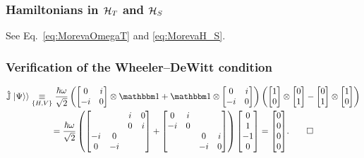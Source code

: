 \subsubsection*{Hamiltonians in $\mathcal{H}_T$ and $\mathcal{H}_S$}

See Eq.~\eqref{eq:MorevaOmegaT} and \eqref{eq:MorevaH_S}.

\subsubsection*{Verification of the Wheeler--DeWitt condition}

\begin{multline}\label{eq:pw:moreva:WheelerDeWittVerification}
  \op{\mathbb{J}} \dket{\Psi} 
  \repr[\setof{H, V}] 
  \frac{\hbar\omega}{\sqrt{2}}
  \left( 
    \left[\begin{matrix}0 & i\\- i & 0\end{matrix}\right]
    \ox
    \idop
    +
    \idop
    \ox
    \left[\begin{matrix}0 & i\\- i & 0\end{matrix}\right]
  \right)
  \left(
    \left[\begin{matrix}1\\0\end{matrix}\right] \ox \left[\begin{matrix}0\\1\end{matrix}\right]
    -
    \left[\begin{matrix}0\\1\end{matrix}\right] \ox \left[\begin{matrix}1\\0\end{matrix}\right] 
  \right)
  \\
  =
  \frac{\hbar\omega}{\sqrt{2}}
  \left(
    \left[\begin{matrix}  &   & i & 0\\  &   & 0 & i\\- i & 0 &   &  \\0 & - i &   &  \end{matrix}\right]
    +
    \left[\begin{matrix}0 & i &   &  \\- i & 0 &   &  \\  &   & 0 & i\\  &   & - i & 0\end{matrix}\right]
  \right)
  \mqty[0 \\ 1 \\ -1 \\ 0]
  =
  \mqty[0 \\ 0 \\ 0 \\ 0]
  \text{.}
  \qed
\end{multline}


